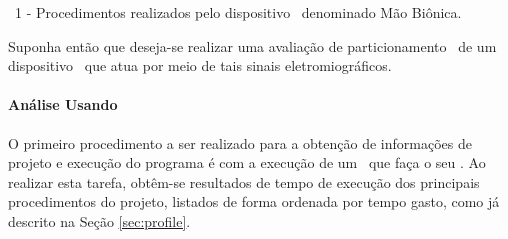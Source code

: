          \begin{algorithm}[h]

            \BlankLine


            \caption{\Wearable\ 1 - Procedimentos realizados pelo dispositivo \wearable\ denominado Mão Biônica.}
            \label{alg:wearable1}
         \end{algorithm}

         Suponha então que deseja-se realizar uma avaliação de particionamento \hs\ de um dispositivo \wearable\ que atua por meio de tais sinais eletromiográficos.

      \paragraph{Análise Usando \Profile}
         O primeiro procedimento a ser realizado para a obtenção de informações de projeto e execução do programa é com a execução de um \software\ que faça o seu \profile.
         Ao realizar esta tarefa, obtêm-se resultados de tempo de execução dos principais procedimentos do projeto, listados de forma ordenada por tempo gasto, como já descrito na Seção \ref{sec:profile}.
         
